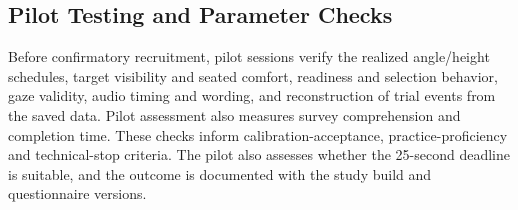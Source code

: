 \subsection{Pilot Testing and Parameter Checks}
\label{sec:pilot}
Before confirmatory recruitment, pilot sessions verify the realized angle/height schedules, target visibility and seated comfort, readiness and selection behavior, gaze validity, audio timing and wording, and reconstruction of trial events from the saved data. Pilot assessment also measures survey comprehension and completion time. These checks inform calibration-acceptance, practice-proficiency and technical-stop criteria. The pilot also assesses whether the 25-second deadline is suitable, and the outcome is documented with the study build and questionnaire versions.
